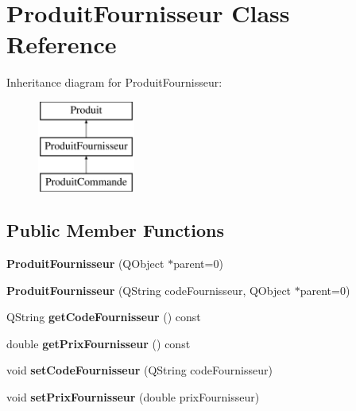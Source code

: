 \hypertarget{class_produit_fournisseur}{
\section{ProduitFournisseur Class Reference}
\label{class_produit_fournisseur}
}
Inheritance diagram for ProduitFournisseur:\begin{figure}[H]
\begin{center}
\leavevmode
\includegraphics[height=3.000000cm]{class_produit_fournisseur}
\end{center}
\end{figure}
\subsection*{Public Member Functions}
\begin{DoxyCompactItemize}
\item 
\hypertarget{class_produit_fournisseur_a22947eda01faddbef3891aeb93d36097}{
{\bfseries ProduitFournisseur} (QObject $\ast$parent=0)}
\label{class_produit_fournisseur_a22947eda01faddbef3891aeb93d36097}

\item 
\hypertarget{class_produit_fournisseur_acb77ad5cee2d9b6f0884a78e86ce82e3}{
{\bfseries ProduitFournisseur} (QString codeFournisseur, QObject $\ast$parent=0)}
\label{class_produit_fournisseur_acb77ad5cee2d9b6f0884a78e86ce82e3}

\item 
\hypertarget{class_produit_fournisseur_ad4417fb8139c72f00d5fcd8397e3896e}{
QString {\bfseries getCodeFournisseur} () const }
\label{class_produit_fournisseur_ad4417fb8139c72f00d5fcd8397e3896e}

\item 
\hypertarget{class_produit_fournisseur_acde400669f987806b0fbf7f389d09cd5}{
double {\bfseries getPrixFournisseur} () const }
\label{class_produit_fournisseur_acde400669f987806b0fbf7f389d09cd5}

\item 
\hypertarget{class_produit_fournisseur_a8e79fe27057a189a8592b8e3eb68694f}{
void {\bfseries setCodeFournisseur} (QString codeFournisseur)}
\label{class_produit_fournisseur_a8e79fe27057a189a8592b8e3eb68694f}

\item 
\hypertarget{class_produit_fournisseur_a32302b4daa879762f32e77f8b44ec1c2}{
void {\bfseries setPrixFournisseur} (double prixFournisseur)}
\label{class_produit_fournisseur_a32302b4daa879762f32e77f8b44ec1c2}

\end{DoxyCompactItemize}
